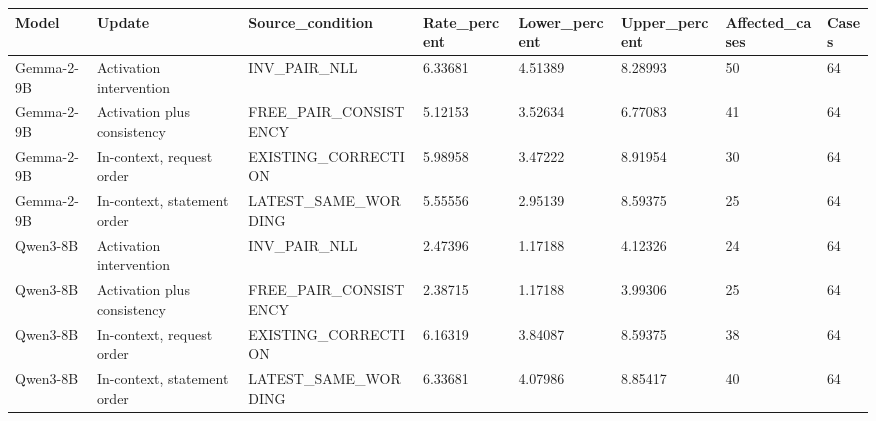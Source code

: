 \begin{tabular}{llllllll}
Model & Update & Source\_condition & Rate\_percent & Lower\_percent & Upper\_percent & Affected\_cases & Cases \\
\hline
Gemma-2-9B & Activation intervention & INV\_PAIR\_NLL & 6.33681 & 4.51389 & 8.28993 & 50 & 64 \\
Gemma-2-9B & Activation plus consistency & FREE\_PAIR\_CONSISTENCY & 5.12153 & 3.52634 & 6.77083 & 41 & 64 \\
Gemma-2-9B & In-context, request order & EXISTING\_CORRECTION & 5.98958 & 3.47222 & 8.91954 & 30 & 64 \\
Gemma-2-9B & In-context, statement order & LATEST\_SAME\_WORDING & 5.55556 & 2.95139 & 8.59375 & 25 & 64 \\
Qwen3-8B & Activation intervention & INV\_PAIR\_NLL & 2.47396 & 1.17188 & 4.12326 & 24 & 64 \\
Qwen3-8B & Activation plus consistency & FREE\_PAIR\_CONSISTENCY & 2.38715 & 1.17188 & 3.99306 & 25 & 64 \\
Qwen3-8B & In-context, request order & EXISTING\_CORRECTION & 6.16319 & 3.84087 & 8.59375 & 38 & 64 \\
Qwen3-8B & In-context, statement order & LATEST\_SAME\_WORDING & 6.33681 & 4.07986 & 8.85417 & 40 & 64 \\
\end{tabular}
